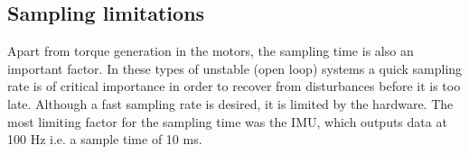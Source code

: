 \subsection{Sampling limitations}
Apart from torque generation in the motors, the sampling time is also an important factor. In these types of unstable (open loop) systems a quick sampling rate is of critical importance in order to recover from disturbances before it is too late. Although a fast sampling rate is desired, it is limited by the hardware. The most limiting factor for the sampling time was the IMU, which outputs data at 100 Hz\cite{IMU-datasheet} i.e. a sample time of 10 ms.